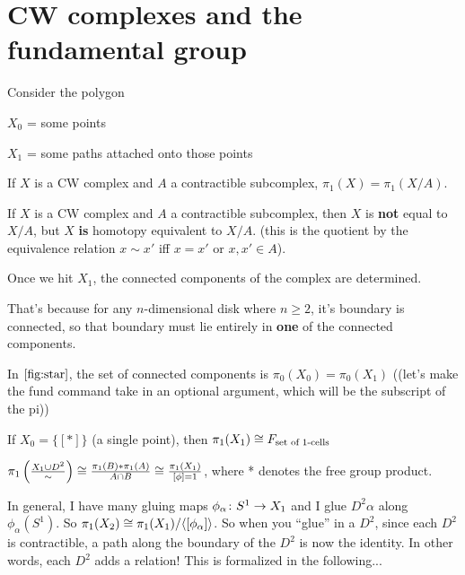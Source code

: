 \documentclass[11pt,leqno,oneside]{amsart}
\newenvironment{dateenv}{
  \vspace{1em}
}{
  \vspace{1em}
}
\newcommand{\mydate}[4]{
  \newdate{#1}{#2}{#3}{#4}
  \begin{dateenv}
    \hfill\displaydate{#1}
  \end{dateenv}
}
\numberwithin{thm}{section}
\newcommand{\fund}[1][1]{\pi_{#1}}
\begin{document}
\mydate{d7}{8}{2}{2017}

\section{CW complexes and the fundamental group}

Consider the polygon
\begin{figure}
  \label{fig:star}
\end{figure}

$X_0$ = some points

$X_1$ = some paths attached onto those points


\begin{thm}
  If $X$ is a CW complex and $A$ a contractible subcomplex, $\fund(X) = \fund(X/A)$.
\end{thm}
\begin{rmk}
  If $X$ is a CW complex and $A$ a contractible subcomplex, then $X$ is \textbf{not} equal to $X/A$, but $X$ \textbf{is} homotopy equivalent to $X/A$. (this is the quotient by the equivalence relation $x \sim x'$ iff $x = x'$ or $x, x' \in A$).
\end{rmk}

Once we hit $X_1$, the connected components of the complex are determined.

That's because for any $n$-dimensional disk where $n \geq 2$, it's boundary is connected, so that boundary must lie entirely in \textbf{one} of the connected components.

In $\ref{fig:star}$, the set of connected components is $\fund[0](X_0) = \fund[0](X_1)$ ((let's make the fund command take in an optional argument, which will be the subscript of the pi))

If $X_0 = \{[*]\}$ (a single point), then $\fund(X_1) \isom F_{\text{set of 1-cells}}$

$\fund\left( \frac{X_1 \union D^2}{\sim} \right) \isom \frac{\fund(B) * \fund(A)}{A \cap B} \isom \frac{\fund(X_1)}{[\phi] = 1}$, where * denotes the free group product.

In general, I have many gluing maps $\phi_\alpha\colon S^1 \to X_1$ and I glue $D^2\alpha$ along $\phi_\alpha(S^1)$.  So $\fund(X_2) \isom \fund(X_1)/\langle[\phi_\alpha]\rangle$.  So when you ``glue'' in a $D^2$, since each $D^2$ is contractible, a path along the boundary of the $D^2$ is now the identity. In other words, each $D^2$ adds a relation!  This is formalized in the following...
\end{document}
